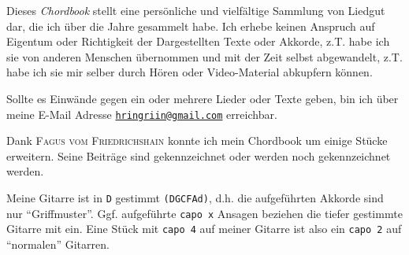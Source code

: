 
\begin{center}
    { \large
        \begin{minipage}[h]{0.7\textwidth}
            \begin{tcolorbox}[colback=red!7,colframe=red!70!black,fonttitle=\bfseries,title=Disclaimer]
                Dieses \textit{Chordbook} stellt eine pers\"{o}nliche und vielf\"{a}ltige Sammlung von Liedgut dar, die ich \"{u}ber die Jahre gesammelt habe.
                Ich erhebe keinen Anspruch auf Eigentum oder Richtigkeit der Dargestellten Texte oder Akkorde, z.T. habe ich sie von anderen Menschen \"{u}bernommen und mit der Zeit selbst abgewandelt, z.T. habe ich sie mir selber durch H\"{o}ren oder Video-Material abkupfern k\"{o}nnen. \par\medskip

                Sollte es Einw\"{a}nde gegen ein oder mehrere Lieder oder Texte geben, bin ich \"{u}ber meine E-Mail Adresse \href{mailto:hringriin@gmail.com}{\texttt{hringriin@gmail.com}} erreichbar. \par\medskip

                Dank \textsc{Fagus vom Friedrichshain} konnte ich mein Chordbook um einige St\"{u}cke erweitern.
                Seine Beitr\"{a}ge sind gekennzeichnet oder werden noch gekennzeichnet werden.
            \end{tcolorbox}
        \end{minipage}
    }

            \vfill

    { \large
        \begin{minipage}[h]{0.7\textwidth}
            \begin{tcolorbox}[colback=red!7,colframe=red!70!black,fonttitle=\bfseries,title=Stimmung der Gitarre]
                Meine Gitarre ist in \texttt{D} gestimmt \texttt{(DGCFAd)}, d.h. die aufgeführten Akkorde sind nur "`Griffmuster"'.
                Ggf. aufgeführte \texttt{capo x} Ansagen beziehen die tiefer gestimmte Gitarre mit ein.
                Eine Stück mit \texttt{capo 4} auf meiner Gitarre ist also ein \texttt{capo 2} auf "`normalen"' Gitarren.
            \end{tcolorbox}
        \end{minipage}
    }
\end{center}
